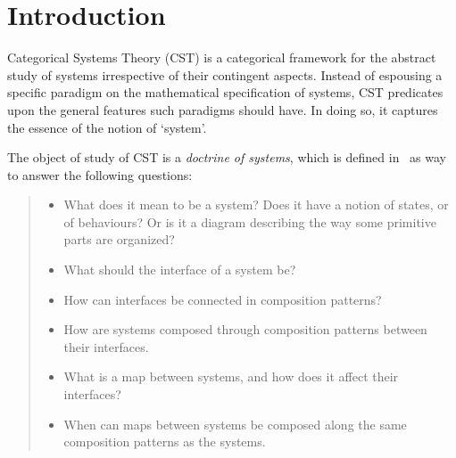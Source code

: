 
\section{Introduction}



Categorical Systems Theory (CST) is a categorical framework for the abstract study of systems irrespective of their contingent aspects.
%
Instead of espousing a specific paradigm on the mathematical specification of systems, CST predicates upon the general features such paradigms should have.
In doing so, it captures the essence of the notion of `system'.

The object of study of CST is a \emph{doctrine of systems}, which is defined in~\cite{myers_categorical_2022} as way to answer the following questions:
\begin{quote}
	\begin{itemize}
		\item What does it mean to be a system? Does it have a notion of states, or of behaviours? Or is it a diagram describing the way some primitive parts are organized?
		\item What should the interface of a system be?
		\item How can interfaces be connected in composition patterns?
		\item How are systems composed through composition patterns between their interfaces.
		\item What is a map between systems, and how does it affect their interfaces?
		\item When can maps between systems be composed along the same composition patterns as the systems.
	 \end{itemize}
\end{quote}

